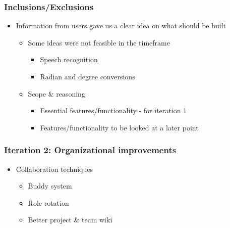 \documentclass{beamer}
\begin{document}
\begin{frame}
\frametitle{Inclusions/Exclusions}
\begin{itemize}
 \item Information from users gave us a clear idea on what should be built
  \begin{itemize}
  \item Some ideas were not feasible in the timeframe
  \begin{itemize}
    \item Speech recognition
    \item Radian and degree conversions
  \end{itemize}
  \item Scope \& reasoning
    \begin{itemize}
    \item Essential features/functionality - for iteration 1
    \item Features/functionality to be looked at a later point
  \end{itemize}
  \end{itemize}
  \end{itemize}
\end{frame}

\begin{frame}
\frametitle{Iteration 2: Organizational improvements}
\begin{itemize}
 \item Collaboration techniques
  \begin{itemize}
   \item Buddy system
   \item Role rotation
   \item Better project \& team wiki
  \end{itemize}
\end{itemize}
\end{frame}
\end{document}
